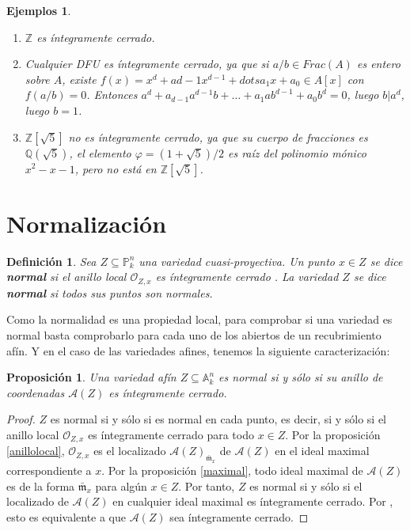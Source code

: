 \documentclass[a4paper,10pt]{book}
\newtheorem{prop}[thm]{Proposición}
\newtheorem{defn}[thm]{Definición}
\newtheorem{eje}[thm]{Ejemplos}
\newcommand{\AAA}{\mathbb A}
\newcommand{\PP}{\mathbb P}
\newcommand{\Ank}{\AAA^n_k}
\newcommand{\Pnk}{\PP^n_k}
\newcommand{\calA}{{\mathcal A}}
\newcommand{\mm}{{\mathfrak m}}
\begin{document}
\begin{eje}\mbox{}
\begin{enumerate}
	\item $\mathbb{Z}$ es íntegramente cerrado.
	\item Cualquier DFU es íntegramente cerrado, ya que si $a/b \in Frac(A)$ es entero sobre $A$, existe $f(x) = x^d+a{d-1}x^{d-1}+dots a_1x+a_0 \in A[x]$ con $f(a/b) = 0$. Entonces $a^d+a_{d-1}a^{d-1}b+\dots+a_1ab^{d-1}+a_0b^d = 0$, luego $b | a^d$, luego $b=1$.
	\item $\mathbb{Z}[\sqrt{5}] $ no es íntegramente cerrado, ya que su cuerpo de fracciones es $\mathbb{Q}(\sqrt{5})$, el elemento $\varphi = (1+\sqrt{5})/2$ es raíz del polinomio mónico $x^2-x-1$, pero no está en $\mathbb{Z}[\sqrt{5}]$.
\end{enumerate}
\end{eje}
 
\section{Normalización}

\begin{defn}
 Sea $Z\subseteq\Pnk$ una variedad cuasi-proyectiva. Un punto $x\in Z$ se dice {\bf normal} si el anillo local ${\mathcal O}_{Z,x}$ es íntegramente cerrado \cite[Capítulo 5]{am}. La variedad $Z$ se dice {\bf normal} si todos sus puntos son normales.
\end{defn}

Como la normalidad es una propiedad local, para comprobar si una variedad es normal basta comprobarlo para cada uno de los abiertos de un recubrimiento afín. Y en el caso de las variedades afines, tenemos la siguiente caracterización:

\begin{prop}
 Una variedad afín $Z\subseteq\Ank$ es normal si y sólo si su anillo de coordenadas $\calA(Z)$ es íntegramente cerrado.
\end{prop}

\begin{proof}
 $Z$ es normal si y sólo si es normal en cada punto, es decir, si y sólo si el anillo local ${\mathcal O}_{Z,x}$ es íntegramente cerrado para todo $x\in Z$. Por la proposición \ref{anillolocal}, ${\mathcal O}_{Z,x}$ es el localizado $\calA(Z)_{\bar\mm_x}$ de $\calA(Z)$ en el ideal maximal correspondiente a $x$. Por la proposición \ref{maximal}, todo ideal maximal de $\calA(Z)$ es de la forma $\bar\mm_x$ para algún $x\in Z$. Por tanto, $Z$ es normal si y sólo si el localizado de $\calA(Z)$ en cualquier ideal maximal es íntegramente cerrado. Por \cite[proposición 5.13]{am}, esto es equivalente a que $\calA(Z)$ sea íntegramente cerrado.
\end{proof}
\end{document}
